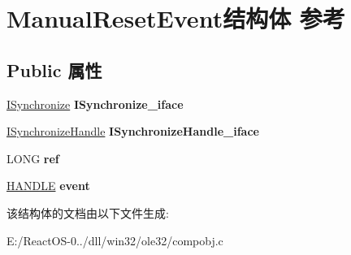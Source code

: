 \hypertarget{struct_manual_reset_event}{}\section{Manual\+Reset\+Event结构体 参考}
\label{struct_manual_reset_event}
\subsection*{Public 属性}
\begin{DoxyCompactItemize}
\item 
\mbox{\label{struct_manual_reset_event_a18dbc1b3141e2dca06d88c63e78aca1a}} 
\hyperlink{interface_i_synchronize}{I\+Synchronize} {\bfseries I\+Synchronize\+\_\+iface}
\item 
\mbox{\label{struct_manual_reset_event_a9a509a5b896270ad58801d24f086d32d}} 
\hyperlink{interface_i_synchronize_handle}{I\+Synchronize\+Handle} {\bfseries I\+Synchronize\+Handle\+\_\+iface}
\item 
\mbox{\label{struct_manual_reset_event_aaa7fa623b01653931fc699f0230c9d3e}} 
L\+O\+NG {\bfseries ref}
\item 
\mbox{\label{struct_manual_reset_event_a8e5bc3cd229625af101b216bbd851577}} 
\hyperlink{interfacevoid}{H\+A\+N\+D\+LE} {\bfseries event}
\end{DoxyCompactItemize}


该结构体的文档由以下文件生成\+:\begin{DoxyCompactItemize}
\item 
E\+:/\+React\+O\+S-\/0../dll/win32/ole32/compobj.\+c\end{DoxyCompactItemize}
